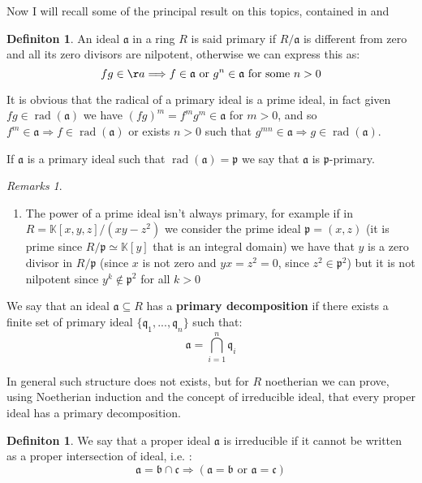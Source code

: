 \documentclass[a4wide]{book}
\theoremstyle{plain}
\theoremstyle{remark}
\newtheorem{rems}[rem]{Remarks}
\theoremstyle{definition}
\newtheorem{deff}[teo]{Definiton}
\newcommand{\K}{\mathbb{K}}
\newcommand{\p}{\mathfrak{p}}
\newcommand{\q}{\mathfrak{q}}
\newcommand{\A}{\mathfrak{a}}
\newcommand{\B}{\mathfrak{b}}
\newcommand{\Cc}{\mathfrak{c}}
\DeclareMathOperator{\rad}{rad}
\begin{document}
Now I will recall some of the principal result on this topics, contained in \cite[Section 7]{Reid} and \cite[Section 4 and Page 83]{AMCD}

\begin{deff}
	An ideal $ \A $ in a ring $ R $ is said primary if $ R/\A$ is different from zero and all its zero divisors are nilpotent, otherwise we can express this as:
	\begin{equation*}
		fg \in \aa \Longrightarrow f \in \A \text{ or } g^n \in \A \text{ for some } n >0
	\end{equation*}
\end{deff}

It is obvious that the radical of a primary ideal is a prime ideal, in fact given $ fg \in \rad(\A)  $ we have $ (fg)^m = f^m g^m \in \A $ for $ m>0 $, and so $ f^m \in \A \Rightarrow f \in \rad(\A)$ or exists $ n>0 $ such that $ g^{mn} \in \A \Rightarrow g \in \rad(\A) $.

If $ \A $ is a primary ideal such that $ \rad(\A) = \p $ we say that $ \A $ is {$ \p $-primary}.

\begin{rems} \label{rem:power_primary} \quad 
	\begin{enumerate}
	\item The power of a prime ideal isn't always primary, for example if in $ R = \K[x,y,z] / (xy - z^2) $ we consider the prime ideal $ \p = (x,z) $ (it is prime since $ R / \p \simeq \K[y]$ that is an integral domain) we have that $ y $ is a zero divisor in $R/\p $ (since $ x $ is not zero and $ yx = z^2 = 0 $, since $z^2 \in \p^2 $) but it is not nilpotent since $ y^k \not \in \p^2 $ for all $ k>0 $
	\end{enumerate}
\end{rems}

We say that an ideal $ \A \subseteq R $ has a \textbf{primary decomposition}  if there exists a finite set of primary ideal $ \{ \q_1 , ... , \q_n\} $ such that:
\begin{equation*}
	\A = \bigcap_{i=1}^n \q_i
\end{equation*}

In general such structure does not exists, but for $ R $ noetherian we can prove, using Noetherian induction and the concept of irreducible ideal, that every proper ideal has a primary decomposition.

\begin{deff}
	We say that a proper ideal $ \A $ is irreducible if it cannot be written as a proper intersection of ideal, i.e. :
	\begin{equation*}
		\A = \B \cap \Cc \Longrightarrow (\A = \B \text{ or } \A = \Cc)
	\end{equation*}
\end{deff}
\end{document}
